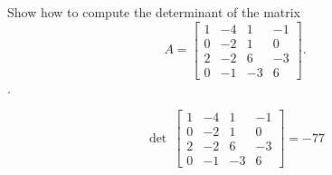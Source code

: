 
\begin{exerciseStatement}


Show how to compute the determinant of the matrix \[A= \left[\begin{array}{cccc}
1 & -4 & 1 & -1 \\
0 & -2 & 1 & 0 \\
2 & -2 & 6 & -3 \\
0 & -1 & -3 & 6
\end{array}\right] .\].


\end{exerciseStatement}
    
\begin{exerciseAnswer} 
\[\operatorname{det}\  \left[\begin{array}{cccc}
1 & -4 & 1 & -1 \\
0 & -2 & 1 & 0 \\
2 & -2 & 6 & -3 \\
0 & -1 & -3 & 6
\end{array}\right] = -77 \]
\end{exerciseAnswer}
    
